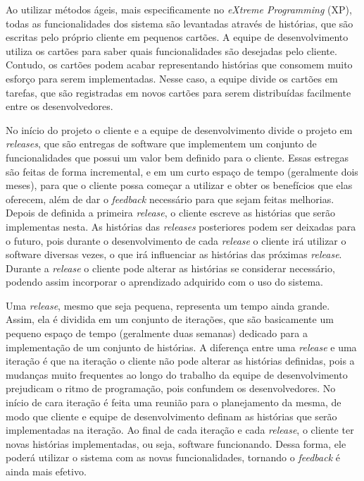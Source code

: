 Ao utilizar métodos ágeis, mais especificamente no \textit{eXtreme Programming} (XP), todas as funcionalidades dos sistema são levantadas através de histórias, que são escritas pelo próprio cliente em pequenos cartões. A equipe de desenvolvimento utiliza os cartões para saber quais funcionalidades são desejadas pelo cliente. Contudo, os cartões podem acabar representando histórias que consomem muito esforço para serem implementadas. Nesse caso, a equipe divide os cartões em tarefas, que são registradas em novos cartões para serem distribuídas facilmente entre os desenvolvedores.

No início do projeto o cliente e a equipe de desenvolvimento divide o projeto em \textit{releases}, que são entregas de software que implementem um conjunto de funcionalidades que possui um valor bem definido para o cliente. Essas estregas são feitas de forma incremental, e em um curto espaço de tempo (geralmente dois meses), para que o cliente possa começar a utilizar e obter os benefícios que elas oferecem, além de dar o \textit{feedback} necessário para que sejam feitas melhorias. Depois de definida a primeira \textit{release}, o cliente escreve as histórias que serão implementas nesta. As histórias das \textit{releases} posteriores podem ser deixadas para o futuro, pois durante o desenvolvimento de cada \textit{release} o cliente irá utilizar o software diversas vezes, o que irá influenciar as histórias das próximas \textit{release}. Durante a \textit{release} o cliente pode alterar as histórias se considerar necessário, podendo assim incorporar o aprendizado adquirido com o uso do sistema.

Uma \textit{release}, mesmo que seja pequena, representa um tempo ainda grande. Assim, ela é dividida em um conjunto de iterações, que são basicamente um pequeno espaço de tempo (geralmente duas semanas) dedicado para a implementação de um conjunto de histórias. A diferença entre uma \textit{release} e uma iteração é que na iteração o cliente não pode alterar as histórias definidas, pois a mudanças muito frequentes ao longo do trabalho da equipe de desenvolvimento prejudicam o ritmo de programação, pois confundem os desenvolvedores. No início de cara iteração é feita uma reunião para o planejamento da mesma, de modo que cliente e equipe de desenvolvimento definam as histórias que serão implementadas na iteração. Ao final de cada iteração e cada \textit{release}, o cliente ter novas histórias implementadas, ou seja, software funcionando. Dessa forma, ele poderá utilizar o sistema com as novas funcionalidades, tornando o \textit{feedback} é ainda mais efetivo.

